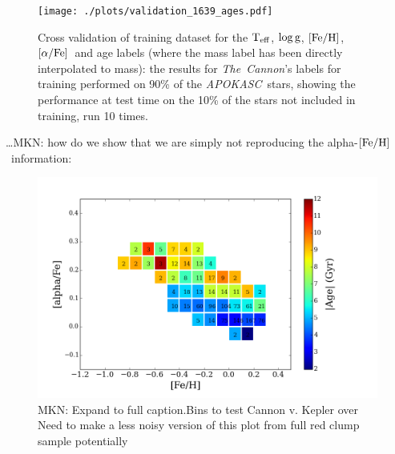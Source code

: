 \documentclass[12pt, preprint]{aastex}
\newcommand{\project}[1]{\textsl{#1}}
\newcommand{\tc}{\project{The~Cannon}}
\newcommand{\apokasc}{\project{APOKASC}}
\newcommand{\teff}{\mbox{$\rm T_{eff}$}}
\newcommand{\feh}{\mbox{$\rm [Fe/H]$}}
\newcommand{\alphafe}{\mbox{$\rm [\alpha/Fe]$}}
\newcommand{\logg}{\mbox{$\rm \log g$}}
\begin{document}
\begin{figure}[p!]
\centering
        \texttt{[image: ./plots/validation\_1639\_ages.pdf]}
  \caption{Cross validation of training dataset for the \teff, \logg, \feh, \alphafe\ and age labels (where the mass label has been directly interpolated to mass): the results for \tc's labels for training performed on 90\% of the \apokasc\ stars, showing the performance at test time on the 10\% of the stars not included in training, run 10 times.}
\label{fig:validation}
\end{figure}


\ldots MKN: how do we show that we are simply not reproducing the alpha-\feh\ information:

\begin{figure}[p!]
\centering
    \includegraphics[scale=0.31]{./plots/alpha_feh_bins.png}
    \caption{MKN: Expand to full caption.Bins to test Cannon v. Kepler over  Need to make a less noisy version of this plot from full red clump sample potentially  }
\label{fig:alphabins}
\end{figure}
\end{document}
